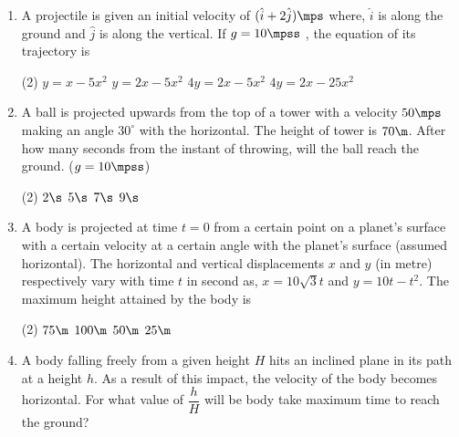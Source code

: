\documentclass{article}
\renewcommand{\ans}{\quad}
\begin{document}
\begin{enumerate}
    \item A projectile is given an initial velocity of $(\hat{i} + 2\hat{j}) \mps$ where, $\hat{i}$ is along the ground and $\hat{j}$ is along the vertical. If $g = 10 \mpss$ , the equation of its trajectory is
	\begin{center}
	\end{center}
	\begin{tasks}(2)
		\task $y=x-5x^2$
		\task $y=2x-5x^2$\ans
		\task $4y=2x-5x^2$
		\task $4y=2x-25x^2$
	\end{tasks}
	
	\item A ball is projected upwards from the top of a tower with a velocity $50\mps$ making an angle $30^\circ$ with the horizontal. The height of tower is $70 \m$. After how many seconds from the instant of throwing, will the ball reach the ground. ($g = 10 \mpss$)	
	\begin{tasks}(2)
		\task $2\s$
		\task $5\s$
		\task $7\s$\ans
		\task $9\s$
	\end{tasks}
	
	
	
	\item A body is projected at time $t = 0$ from a certain point on a planet's surface with a certain velocity at a certain angle with the planet's surface (assumed horizontal). The horizontal and vertical displacements $x$ and $y$ (in metre) respectively vary with time $t$ in second as, $x = 10\sqrt{3}t$ and $y = 10t-t^2$. The maximum height attained by the body is
	\begin{tasks}(2)
		\task $75\m$
		\task $100\m$
		\task $50\m$
		\task $25\m$\ans
	\end{tasks}
	

    \item A body falling freely from a given height $H$ hits an inclined plane in its path at a height $h$. As a result of this impact, the velocity of the body becomes horizontal. For what value of $\dfrac{h}{H}$ will be body take maximum time to reach the ground?
        

\end{enumerate}
\end{document}

